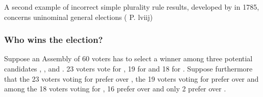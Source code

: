 \documentclass[a4paper,12pt,english]{sphinxhowto}
\begin{document}
\sphinxAtStartPar
A second example of incorrect simple plurality rule results, developed by  in 1785, concerns uninominal general elections ( P. lviij)


\subsubsection{Who wins the election?}
\label{\detokenize{pearls:who-wins-the-election}}
\sphinxAtStartPar
Suppose an Assembly of 60 voters has to select a winner among three potential candidates , , and . 23 voters vote for , 19 for  and 18 for . Suppose furthermore that the 23 voters voting for  prefer  over , the 19 voters voting for  prefer  over  and among the 18 voters voting for , 16 prefer  over  and only 2 prefer  over .
\end{document}
